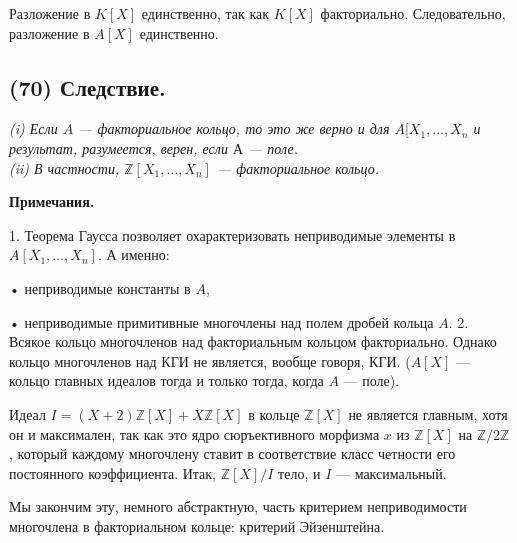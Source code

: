\documentclass{mai_book}
\begin{document}
\noindent Разложение в $K[X]$ единственно, так как $K[X]$ факториально. Следовательно, разложение в $A[X]$ единственно.
\subsection*{(70) Следствие.}

\textit{(i) Если $A$ — факториальное кольцо, то это же верно и для $A[X_{1},\ldots,X_{n}$ и результат, разумеется, верен, если $А$ — поле.\\
(ii) В частности, $\mathbb{Z}[X_{1},\ldots,X_{n}]$ — факториальное кольцо.}

\textbf{Примечания.}

1. Теорема Гаусса позволяет охарактеризовать неприводимые элементы в $A[X_{1},\ldots,X_{n}]$. А именно:

• неприводимые константы в $A$,

• неприводимые примитивные многочлены над полем дробей кольца $A$.
2. Всякое кольцо многочленов над факториальным кольцом факториально. Однако кольцо многочленов над КГИ не является, вообще говоря, КГИ. ($A[X]$ — кольцо главных идеалов тогда и только тогда, когда $A$ — поле).

Идеал $I=(X+2)\mathbb{Z}[X]+X\mathbb{Z}[X]$ в кольце $\mathbb{Z}[X]$ не является главным, хотя он и максимален, так как это ядро сюръективного морфизма $x$ из $\mathbb{Z}[X]$ на $\mathbb{Z}/2\mathbb{Z}$, который каждому многочлену ставит в соответствие класс четности его постоянного коэффициента. Итак, $\mathbb{Z}[X]/I$ тело, и $I$ — максимальный.

Мы закончим эту, немного абстрактную, часть критерием неприводимости многочлена в факториальном кольце: критерий Эйзенштейна.
\end{document}

